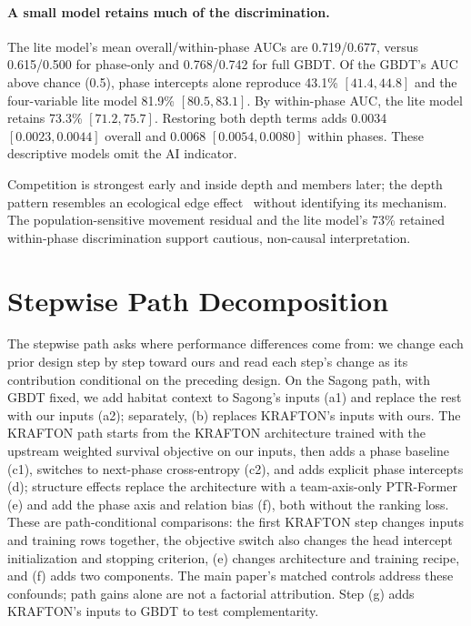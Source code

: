 \documentclass[sigconf,anonymous,nonacm]{acmart}
\begin{document}
\paragraph{A small model retains much of the discrimination.}
The lite model's mean overall/within-phase AUCs are 0.719/0.677, versus 0.615/0.500 for phase-only and 0.768/0.742 for full GBDT. Of the GBDT's AUC above chance (0.5), phase intercepts alone reproduce 43.1\% $[41.4,\allowbreak 44.8]$ and the four-variable lite model 81.9\% $[80.5,\allowbreak 83.1]$. By within-phase AUC, the lite model retains 73.3\% $[71.2,\allowbreak 75.7]$. Restoring both depth terms adds 0.0034 $[0.0023,\allowbreak 0.0044]$ overall and 0.0068 $[0.0054,\allowbreak 0.0080]$ within phases. These descriptive models omit the AI indicator.

Competition is strongest early and inside depth and members later; the depth pattern resembles an ecological edge effect~\cite{Ries04} without identifying its mechanism. The population-sensitive movement residual and the lite model's 73\% retained within-phase discrimination support cautious, non-causal interpretation.

\section{Stepwise Path Decomposition}
The stepwise path asks where performance differences come from: we change each prior design step by step toward ours and read each step's change as its contribution conditional on the preceding design.
On the Sagong path, with GBDT fixed, we add habitat context to Sagong's inputs (a1) and replace the rest with our inputs (a2); separately, (b) replaces KRAFTON's inputs with ours.
The KRAFTON path starts from the KRAFTON architecture trained with the upstream weighted survival objective on our inputs, then adds a phase baseline (c1), switches to next-phase cross-entropy (c2), and adds explicit phase intercepts (d); structure effects replace the architecture with a team-axis-only PTR-Former (e) and add the phase axis and relation bias (f), both without the ranking loss.
These are path-conditional comparisons: the first KRAFTON step changes inputs and training rows together, the objective switch also changes the head intercept initialization and stopping criterion, (e) changes architecture and training recipe, and (f) adds two components. The main paper's matched controls address these confounds; path gains alone are not a factorial attribution.
Step (g) adds KRAFTON's inputs to GBDT to test complementarity.
\end{document}
